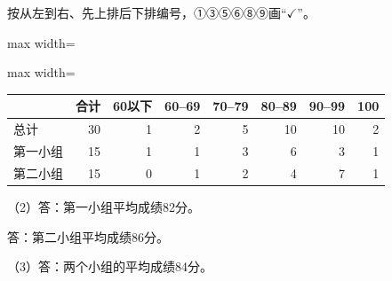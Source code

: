 
\begingroup\color{answerred}按从左到右、先上排后下排编号，①③⑤⑥⑧⑨画“$\checkmark$”。\par\endgroup
{}
\begingroup\color{answerred}\par\noindent\begin{center}\end{center}\par\endgroup
{}
\begingroup\color{answerred}\par\smallskip\noindent\begin{adjustbox}{max width=\linewidth}\begin{adjustbox}{max width=\linewidth}\begin{tabular}{lrrrrrrr}\toprule & 合计 & 60以下 & 60--69 & 70--79 & 80--89 & 90--99 & 100\\\midrule
总计&30&1&2&5&10&10&2\\第一小组&15&1&1&3&6&3&1\\第二小组&15&0&1&2&4&7&1\\\bottomrule\end{tabular}\end{adjustbox}\end{adjustbox}\par\smallskip\par（2）答：第一小组平均成绩82分。\par\hspace*{2em}答：第二小组平均成绩86分。\par（3）答：两个小组的平均成绩84分。\par\endgroup

